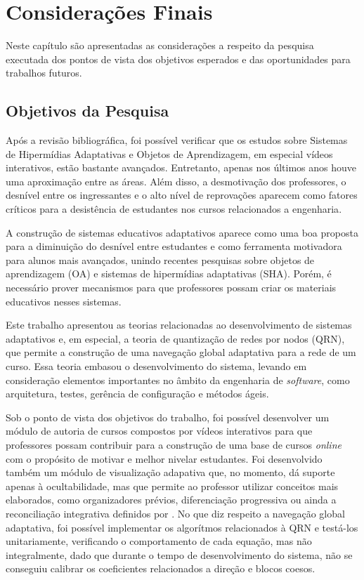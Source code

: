 \chapter*[Considerações Finais]{Considerações Finais}

Neste capítulo são apresentadas as considerações a respeito da pesquisa executada dos pontos de vista dos objetivos esperados e das oportunidades para trabalhos futuros.

\section*{Objetivos da Pesquisa}

Após a revisão bibliográfica, foi possível verificar que os estudos sobre Sistemas de Hipermídias Adaptativas e Objetos de Aprendizagem, em especial vídeos interativos, estão bastante avançados. Entretanto, apenas nos últimos anos houve uma aproximação entre as áreas. Além disso, a desmotivação dos professores, o desnível entre os ingressantes e o alto nível de reprovações aparecem como fatores críticos para a desistência de estudantes nos cursos relacionados a engenharia\cite{silva2005}. 

A construção de sistemas educativos adaptativos aparece como uma boa proposta para a diminuição do desnível entre estudantes e como ferramenta motivadora para alunos mais avançados, unindo recentes pesquisas sobre objetos de aprendizagem (OA) e sistemas de hipermídias adaptativas (SHA). Porém, é necessário prover mecanismos para que professores possam criar os materiais educativos nesses sistemas.

Este trabalho apresentou as teorias relacionadas ao desenvolvimento de sistemas adaptativos e, em especial, a teoria de quantização de redes por nodos (QRN), que permite a construção de uma navegação global adaptativa para a rede de um curso. Essa teoria embasou o desenvolvimento do sistema, levando em consideração elementos importantes no âmbito da engenharia de \textit{software}, como arquitetura, testes, gerência de configuração e métodos ágeis. 

Sob o ponto de vista dos objetivos do trabalho, foi possível desenvolver um módulo de autoria de cursos compostos por vídeos interativos para que professores possam contribuir para a construção de uma base de cursos \textit{online} com o propósito de motivar e melhor nivelar estudantes. Foi desenvolvido também um módulo de visualização adapativa que, no momento, dá suporte apenas à ocultabilidade, mas que permite ao professor utilizar conceitos mais elaborados, como organizadores prévios, diferenciação progressiva ou ainda a reconciliação integrativa definidos por . No que diz respeito a navegação global adaptativa, foi possível implementar os algorítmos relacionados à QRN e testá-los unitariamente, verificando o comportamento de cada equação, mas não integralmente, dado que durante o tempo de desenvolvimento do sistema, não se conseguiu calibrar os coeficientes relacionados a direção e blocos coesos. 


